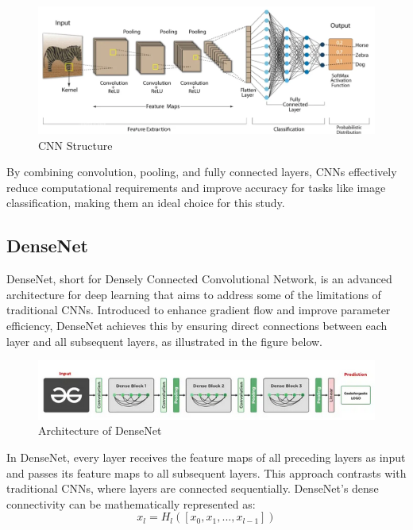 \begin{figure}[h!]
    \centering
    \includegraphics[width=1\linewidth]{images/CNN_example.png}
    \caption{CNN Structure}
    \label{fig:enter-label}
\end{figure}

By combining convolution, pooling, and fully connected layers, CNNs effectively reduce computational requirements and improve accuracy for tasks like image classification, making them an ideal choice for this study.



\subsection{DenseNet}
DenseNet, short for Densely Connected Convolutional Network, is an advanced architecture for deep learning that aims to address some of the limitations of traditional CNNs. Introduced to enhance gradient flow and improve parameter efficiency, DenseNet achieves this by ensuring direct connections between each layer and all subsequent layers, as illustrated in the figure below.

\begin{figure}[h!]
    \centering
    \includegraphics[width=1\linewidth]{images/dense_net_arquitetura.png}
    \caption{Architecture of DenseNet}
    \label{fig:enter-label}
\end{figure}

In DenseNet, every layer receives the feature maps of all preceding layers as input and passes its feature maps to all subsequent layers. This approach contrasts with traditional CNNs, where layers are connected sequentially. DenseNet’s dense connectivity can be mathematically represented as:
\[
x_l = H_l([x_0, x_1, ..., x_{l-1}])
\]


